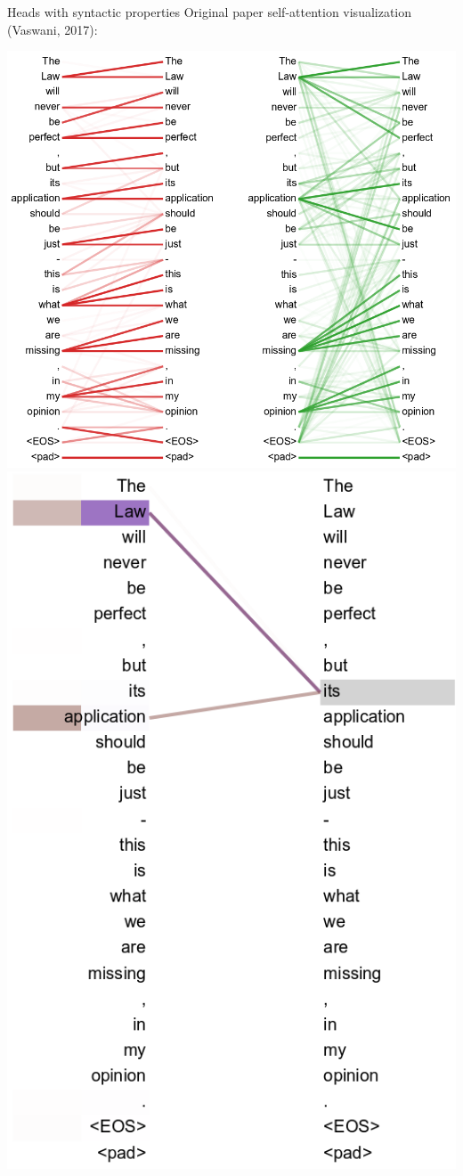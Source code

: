 \documentclass{beamer}
\begin{document}
\begin{frame}{Heads with syntactic properties}
    Original paper self-attention visualization (Vaswani, 2017):
    \begin{center}
    \includegraphics[scale=0.22]{vasw1.png}
    \includegraphics[scale=0.219]{vasw2.png}

\end{center}
\end{frame}
\end{document}
